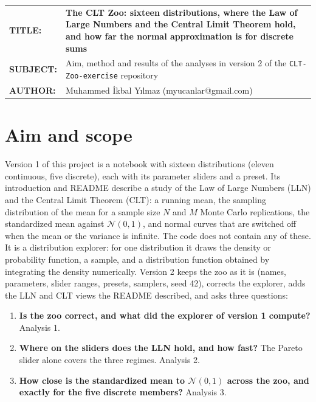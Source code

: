 \documentclass[11pt,a4paper]{article}
\begin{document}
\vspace*{14pt}
\begin{tabular}{@{}p{2.35cm}@{}p{\dimexpr\textwidth-2.35cm}@{}}
\textbf{TITLE:} & \textbf{\large The CLT Zoo: sixteen distributions, where the Law of Large Numbers and the Central Limit Theorem hold, and how
far the normal approximation is for discrete sums}\\[3pt]
\textbf{SUBJECT:} & Aim, method and results of the analyses in version 2 of the \texttt{CLT-Zoo-exercise} repository\\[3pt]
\textbf{AUTHOR:} & Muhammed İkbal Yılmaz (myucanlar@gmail.com)
\end{tabular}

\vspace{8pt}
\vspace{12pt}

\section{Aim and scope}

Version 1 of this project is a notebook with sixteen distributions (eleven continuous, five discrete), each with its parameter
sliders and a preset. Its introduction and README describe a study of the Law of Large Numbers (LLN) and the Central Limit Theorem
(CLT): a running mean, the sampling distribution of the mean for a sample size $N$ and $M$ Monte Carlo replications, the
standardized mean against $\mathcal N(0,1)$, and normal curves that are switched off when the mean or the variance is infinite. The
code does not contain any of these. It is a distribution explorer: for one distribution it draws the density or probability
function, a sample, and a distribution function obtained by integrating the density numerically. Version 2 keeps the zoo as it is
(names, parameters, slider ranges, presets, samplers, seed 42), corrects the explorer, adds the LLN and CLT views the README
described, and asks three questions:

\begin{enumerate}
  \item \textbf{Is the zoo correct, and what did the explorer of version 1 compute?} Analysis 1.
  \item \textbf{Where on the sliders does the LLN hold, and how fast?} The Pareto slider alone covers the three regimes. Analysis 2.
  \item \textbf{How close is the standardized mean to $\mathcal N(0,1)$ across the zoo, and exactly for the five discrete members?}
  Analysis 3.
\end{enumerate}
\end{document}
